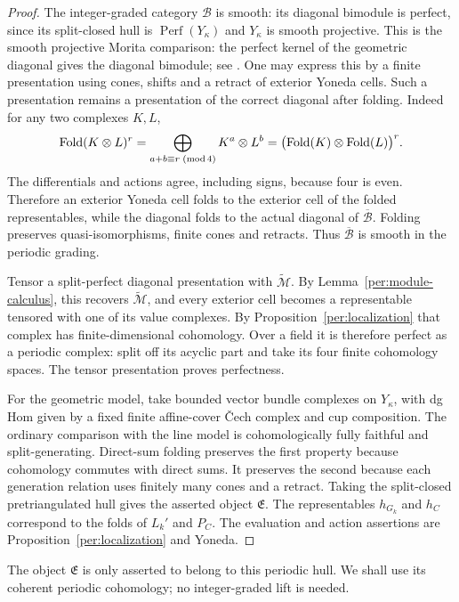 \documentclass[11pt]{article}
\theoremstyle{definition}
\theoremstyle{remark}
\numberwithin{equation}{section}
\begin{document}
\begin{proof}
The integer-graded category $\mathcal B$ is smooth: its diagonal
bimodule is perfect, since its split-closed hull is
$\operatorname{Perf}(Y_\kappa)$ and $Y_\kappa$ is smooth projective.  This is the
smooth projective Morita comparison: the perfect kernel of the
geometric diagonal gives the diagonal bimodule; see
\cite{toen-vaquie}.  One may express
this by a finite presentation using cones, shifts and a retract of
exterior Yoneda cells.  Such a presentation remains a presentation of
the correct diagonal after folding.  Indeed for any two complexes
$K,L$,
\[
 \operatorname{Fold}(K\otimes L)^r
   =\bigoplus_{a+b\equiv r\;({\rm mod}\,4)}K^a\otimes L^b
   =\bigl(\operatorname{Fold}(K)\otimes
                      \operatorname{Fold}(L)\bigr)^r.
\]
The differentials and actions agree, including signs, because four
is even.  Therefore an exterior Yoneda cell folds to the exterior
cell of the folded representables, while the diagonal folds to the
actual diagonal of $\overline{\mathcal B}$.  Folding preserves
quasi-isomorphisms, finite cones and retracts.  Thus
$\overline{\mathcal B}$ is smooth in the periodic grading.

Tensor a split-perfect diagonal presentation with
$\widetilde{\mathcal M}$.  By Lemma~\ref{per:module-calculus}, this
recovers $\widetilde{\mathcal M}$, and every exterior cell becomes a
representable tensored with one of its value complexes.  By
Proposition~\ref{per:localization} that complex has finite-dimensional
cohomology.  Over a field it is therefore perfect as a periodic
complex: split off its acyclic part and take its four finite
cohomology spaces.  The tensor presentation proves perfectness.

For the geometric model, take bounded vector bundle complexes on
$Y_\kappa$, with dg Hom given by a fixed finite affine-cover \v Cech
complex and cup composition.  The ordinary comparison with the line
model is cohomologically fully faithful and split-generating.
Direct-sum folding preserves the first property because cohomology
commutes with direct sums.  It preserves the second because each
generation relation uses finitely many cones and a retract.  Taking
the split-closed pretriangulated hull gives the asserted object
$\mathfrak E$.  The representables $h_{G_k}$ and $h_C$ correspond to
the folds of $L_k'$ and $P_C$.  The evaluation and action assertions
are Proposition~\ref{per:localization} and Yoneda.
\end{proof}

The object $\mathfrak E$ is only asserted to belong to this periodic
hull.  We shall use its coherent periodic cohomology; no
integer-graded lift is needed.
\end{document}
